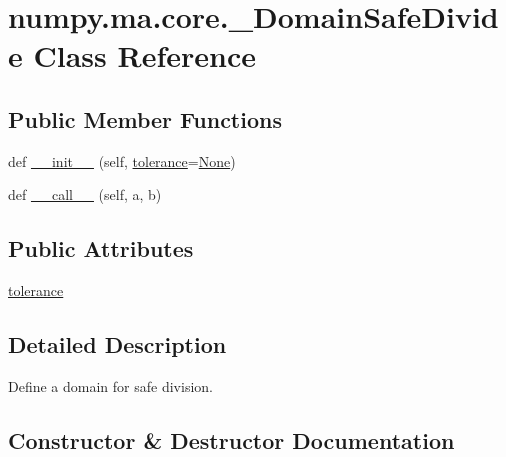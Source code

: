 \hypertarget{classnumpy_1_1ma_1_1core_1_1__DomainSafeDivide}{}\section{numpy.\+ma.\+core.\+\_\+\+Domain\+Safe\+Divide Class Reference}
\label{classnumpy_1_1ma_1_1core_1_1__DomainSafeDivide}
\subsection*{Public Member Functions}
\begin{DoxyCompactItemize}
\item 
def \hyperlink{classnumpy_1_1ma_1_1core_1_1__DomainSafeDivide_a84d7a1776670767804344bfe5cc09d7a}{\+\_\+\+\_\+init\+\_\+\+\_\+} (self, \hyperlink{classnumpy_1_1ma_1_1core_1_1__DomainSafeDivide_a0095e58bd9c811a93502ff8e73321cf5}{tolerance}=\hyperlink{namespacenumpy_1_1ma_1_1core_a647ee1848dfa3692fe35a663a2aa40b3}{None})
\item 
def \hyperlink{classnumpy_1_1ma_1_1core_1_1__DomainSafeDivide_a60301ac58c39306f97f452c53573b39f}{\+\_\+\+\_\+call\+\_\+\+\_\+} (self, a, b)
\end{DoxyCompactItemize}
\subsection*{Public Attributes}
\begin{DoxyCompactItemize}
\item 
\hyperlink{classnumpy_1_1ma_1_1core_1_1__DomainSafeDivide_a0095e58bd9c811a93502ff8e73321cf5}{tolerance}
\end{DoxyCompactItemize}


\subsection{Detailed Description}
\begin{DoxyVerb}Define a domain for safe division.\end{DoxyVerb}
 

\subsection{Constructor \& Destructor Documentation}
\mbox{\label{classnumpy_1_1ma_1_1core_1_1__DomainSafeDivide_a84d7a1776670767804344bfe5cc09d7a}} 
